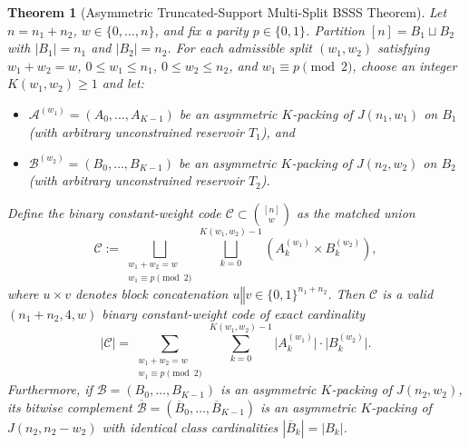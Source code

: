 \documentclass[11pt,letterpaper]{article}
\theoremstyle{plain}
\newtheorem{theorem}{Theorem}
\theoremstyle{definition}
\theoremstyle{remark}
\begin{document}
\begin{theorem}[Asymmetric Truncated-Support Multi-Split BSSS Theorem]
\label{thm:asym_bsss}
Let $n = n_1 + n_2$, $w \in \{0, \dots, n\}$, and fix a parity $p \in \{0, 1\}$. Partition $[n] = B_1 \sqcup B_2$ with $|B_1| = n_1$ and $|B_2| = n_2$. For each admissible split $(w_1, w_2)$ satisfying $w_1 + w_2 = w$, $0 \le w_1 \le n_1$, $0 \le w_2 \le n_2$, and $w_1 \equiv p \pmod 2$, choose an integer $K(w_1, w_2) \ge 1$ and let:
\begin{itemize}[leftmargin=1.6em,itemsep=1pt]
    \item $\mathcal{A}^{(w_1)} = (A_0, \dots, A_{K-1})$ be an asymmetric $K$-packing of $J(n_1, w_1)$ on $B_1$ (with arbitrary unconstrained reservoir $T_1$), and
    \item $\mathcal{B}^{(w_2)} = (B_0, \dots, B_{K-1})$ be an asymmetric $K$-packing of $J(n_2, w_2)$ on $B_2$ (with arbitrary unconstrained reservoir $T_2$).
\end{itemize}
Define the binary constant-weight code $\mathcal{C} \subset \binom{[n]}{w}$ as the matched union
\begin{equation}
\label{eq:asym_code}
\mathcal{C} := \bigsqcup_{\substack{w_1 + w_2 = w \\ w_1 \equiv p \pmod 2}} \bigsqcup_{k=0}^{K(w_1, w_2) - 1} \left( A_k^{(w_1)} \times B_k^{(w_2)} \right),
\end{equation}
where $u \times v$ denotes block concatenation $u \mathbin{\Vert} v \in \{0,1\}^{n_1 + n_2}$. Then $\mathcal{C}$ is a valid $(n_1 + n_2, 4, w)$ binary constant-weight code of exact cardinality
\begin{equation}
\label{eq:asym_card}
|\mathcal{C}| = \sum_{\substack{w_1 + w_2 = w \\ w_1 \equiv p \pmod 2}} \sum_{k=0}^{K(w_1, w_2) - 1} \big|A_k^{(w_1)}\big|\cdot\big|B_k^{(w_2)}\big|.
\end{equation}
Furthermore, if $\mathcal{B} = (B_0, \dots, B_{K-1})$ is an asymmetric $K$-packing of $J(n_2, w_2)$, its bitwise complement $\overline{\mathcal{B}} = (\overline{B}_0, \dots, \overline{B}_{K-1})$ is an asymmetric $K$-packing of $J(n_2, n_2 - w_2)$ with identical class cardinalities $|\overline{B}_k| = |B_k|$.
\end{theorem}
\end{document}
